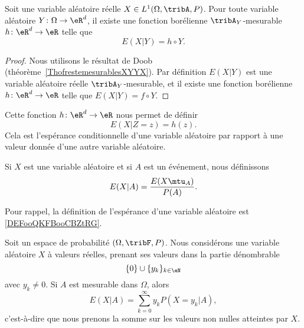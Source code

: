 \begin{proposition}
	Soit une variable aléatoire réelle \( X\in L^1(\Omega,\tribA,P)\). Pour toute variable aléatoire \( Y\colon \Omega\to \eR^d\), il existe une fonction borélienne \( \tribA_Y\)-mesurable \( h\colon \eR^d\to \eR\) telle que
	\begin{equation}
		E(X|Y)=h\circ Y.
	\end{equation}
\end{proposition}

\begin{proof}
	Nous utilisons le résultat de Doob (théorème~\ref{ThofrestemesurablesXYYX}). Par définition \( E(X|Y)\) est une variable aléatoire réelle \( \tribA_Y\)-mesurable, et il existe une fonction borélienne \( h\colon \eR^d\to \eR\) telle que \( E(X|Y)=f\circ Y\).
\end{proof}

Cette fonction \( h\colon \eR^d\to \eR\) nous permet de définir
\begin{equation}
	E(X|Z=z)=h(z).
\end{equation}
Cela est l'espérance conditionnelle d'une variable aléatoire par rapport à une valeur donnée d'une autre variable aléatoire.

\begin{definition}     \label{DEFooOMLCooJgrbpx}
	Si \( X\) est une variable aléatoire et si \( A\) est un événement, nous définissons
	\begin{equation}
		E(X|A)=\frac{ E(X\mtu_A) }{ P(A) }.
	\end{equation}
\end{definition}
Pour rappel, la définition de l'espérance d'une variable aléatoire est \ref{DEFooQKFBooCBZtRG}.

\begin{lemma}    \label{LEMooRTVBooCEeIxL}
	Soit un espace de probabilité \( (\Omega,\tribF,P)\). Nous considérons une variable aléatoire \( X\) à valeurs réelles, prenant ses valeurs dans la partie dénombrable
	\begin{equation}
		\{ 0 \}\cup \{ y_k \}_{k\in \eN}
	\end{equation}
	avec \( y_k\neq 0\).  Si \( A\) est mesurable dans \( \Omega\), alors
	\begin{equation}
		E(X|A)=\sum_{k=0}^{\infty}y_kP(X=y_k|A),
	\end{equation}
	c'est-à-dire que nous prenons la somme sur les valeurs non nulles atteintes par \( X\).
\end{lemma}

